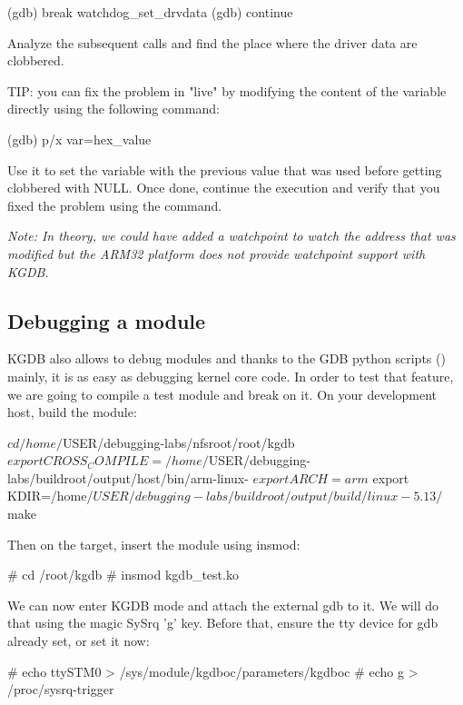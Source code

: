 \begin{bashinput}
(gdb) break watchdog_set_drvdata
(gdb) continue
\end{bashinput}

Analyze the subsequent calls and find the place where the driver data are
clobbered.

TIP: you can fix the problem in "live" by modifying the content of the
 variable directly using the following command:

\begin{bashinput}
(gdb) p/x var=hex_value
\end{bashinput}

Use it to set the variable with the previous value that was used before getting
clobbered with NULL. Once done, continue the execution and verify that you fixed
the problem using the  command.

{\em Note: In theory, we could have added a watchpoint to watch the address that
was modified but the ARM32 platform does not provide watchpoint support with
KGDB.}

\subsection{Debugging a module}

KGDB also allows to debug modules and thanks to the GDB python scripts
() mainly, it is as easy as debugging kernel core code. In
order to test that feature, we are going to compile a test module and break on
it. On your development host, build the module:

\begin{bashinput}
$ cd /home/$USER/debugging-labs/nfsroot/root/kgdb
$ export CROSS_COMPILE=/home/$USER/debugging-labs/buildroot/output/host/bin/arm-linux-
$ export ARCH=arm
$ export KDIR=/home/$USER/debugging-labs/buildroot/output/build/linux-5.13/
$ make
\end{bashinput}

Then on the target, insert the module using insmod:
\begin{bashinput}
# cd /root/kgdb
# insmod kgdb_test.ko
\end{bashinput}

We can now enter KGDB mode and attach the external gdb to it. We will do
that using the magic SySrq 'g' key. Before that, ensure the tty
device for gdb already set, or set it now:

\begin{bashinput}
# echo ttySTM0 > /sys/module/kgdboc/parameters/kgdboc
# echo g > /proc/sysrq-trigger
\end{bashinput}

